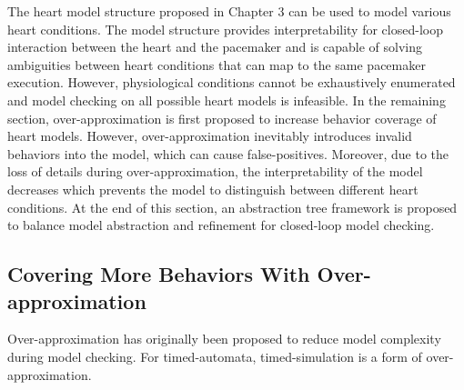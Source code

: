 	The heart model structure proposed in Chapter 3 can be used to model various heart conditions.
	The model structure provides interpretability for closed-loop interaction between the heart and the pacemaker and is capable of solving ambiguities between heart conditions that can map to the same pacemaker execution.
	However, physiological conditions cannot be exhaustively enumerated and model checking on all possible heart models is infeasible.
In the remaining section, over-approximation is first proposed to increase behavior coverage of heart models. 
However, over-approximation inevitably introduces invalid behaviors into the model, which can cause false-positives.
Moreover, due to the loss of details during over-approximation, the interpretability of the model decreases which prevents the model to distinguish between different heart conditions.
At the end of this section, an abstraction tree framework is proposed to balance model abstraction and refinement for closed-loop model checking.
\subsection{Covering More Behaviors With Over-approximation}
Over-approximation \cite{CEGAR} has originally been proposed to reduce model complexity during model checking.
For timed-automata, timed-simulation is a form of over-approximation.

